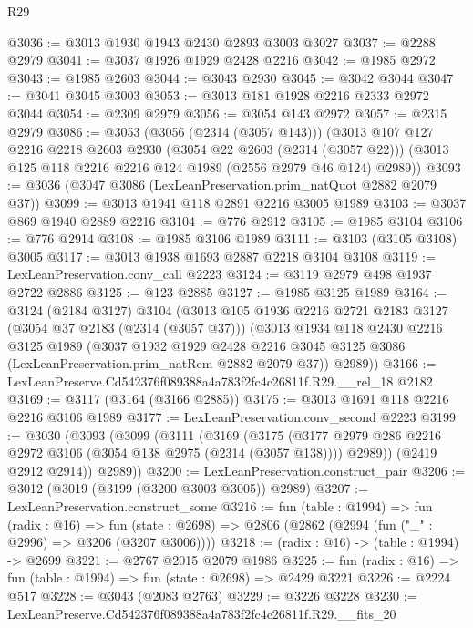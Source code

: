 \begin{lexlean}{R29}
\begin{coremodule}
@3036 := @3013 @1930 @1943 @2430 @2893 @3003 @3027
@3037 := @2288 @2979
@3041 := @3037 @1926 @1929 @2428 @2216
@3042 := @1985 @2972
@3043 := @1985 @2603
@3044 := @3043 @2930
@3045 := @3042 @3044
@3047 := @3041 @3045 @3003
@3053 := @3013 @181 @1928 @2216 @2333 @2972 @3044
@3054 := @2309 @2979
@3056 := @3054 @143 @2972
@3057 := @2315 @2979
@3086 := @3053
    (@3056 (@2314 (@3057 @143)))
    (@3013
      @107
      @127
      @2216
      @2218
      @2603
      @2930
      (@3054 @22 @2603 (@2314 (@3057 @22)))
      (@3013 @125 @118 @2216 @2216 @124 @1989 (@2556 @2979 @46 @124) @2989))
@3093 := @3036 (@3047 @3086 (LexLeanPreservation.prim_natQuot @2882 @2079 @37))
@3099 := @3013 @1941 @118 @2891 @2216 @3005 @1989
@3103 := @3037 @869 @1940 @2889 @2216
@3104 := @776 @2912
@3105 := @1985 @3104
@3106 := @776 @2914
@3108 := @1985 @3106 @1989
@3111 := @3103 (@3105 @3108) @3005
@3117 := @3013 @1938 @1693 @2887 @2218 @3104 @3108
@3119 := LexLeanPreservation.conv_call @2223
@3124 := @3119 @2979 @498 @1937 @2722 @2886
@3125 := @123 @2885
@3127 := @1985 @3125 @1989
@3164 := @3124
    (@2184 @3127)
    @3104
    (@3013
      @105
      @1936
      @2216
      @2721
      @2183
      @3127
      (@3054 @37 @2183 (@2314 (@3057 @37)))
      (@3013
        @1934
        @118
        @2430
        @2216
        @3125
        @1989
        (@3037
          @1932
          @1929
          @2428
          @2216
          @3045
          @3125
          @3086
          (LexLeanPreservation.prim_natRem @2882 @2079 @37))
        @2989))
@3166 := LexLeanPreserve.Cd542376f089388a4a783f2fc4c26811f.R29.__rel_18 @2182
@3169 := @3117 (@3164 (@3166 @2885))
@3175 := @3013 @1691 @118 @2216 @2216 @3106 @1989
@3177 := LexLeanPreservation.conv_second @2223
@3199 := @3030
    (@3093
      (@3099
        (@3111
          (@3169
            (@3175
              (@3177 @2979 @286 @2216 @2972 @3106 (@3054 @138 @2975 (@2314 (@3057 @138))))
              @2989))
          (@2419 @2912 @2914))
        @2989))
@3200 := LexLeanPreservation.construct_pair
@3206 := @3012 (@3019 (@3199 (@3200 @3003 @3005)) @2989)
@3207 := LexLeanPreservation.construct_some
@3216 := fun (table : @1994) =>
  fun (radix : @16) =>
  fun (state : @2698) => @2806 (@2862 (@2994 (fun ("_" : @2996) => @3206 (@3207 @3006))))
@3218 := (radix : @16) -> (table : @1994) -> @2699
@3221 := @2767 @2015 @2079 @1986
@3225 := fun (radix : @16) => fun (table : @1994) => fun (state : @2698) => @2429 @3221
@3226 := @2224 @517
@3228 := @3043 (@2083 @2763)
@3229 := @3226 @3228
@3230 := LexLeanPreserve.Cd542376f089388a4a783f2fc4c26811f.R29.__fits_20

\end{coremodule}
\end{lexlean}
